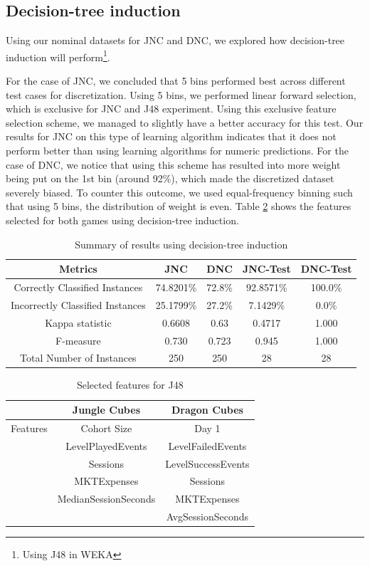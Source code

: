 \subsection{Decision-tree induction}
Using our nominal datasets for JNC and DNC, we explored how decision-tree induction will perform\footnote{Using J48 in WEKA}. 

For the case of JNC, we concluded that 5 bins performed best across different test cases for discretization. Using 5 bins, we performed linear forward selection, which is exclusive for JNC and J48 experiment. Using this exclusive feature selection scheme, we managed to slightly have a better accuracy for this test. Our results for JNC on this type of learning algorithm indicates that it does not perform better than using learning algorithms for numeric predictions. For the case of DNC, we notice that using this scheme has resulted into more weight being put on the 1st bin (around 92\%), which made the discretized dataset severely biased. To counter this outcome, we used equal-frequency binning such that using 5 bins, the distribution of weight is even. Table \ref{table:j48_features} shows the features selected for both games using decision-tree induction.

\begin{table}[h]
\centering
\caption{Summary of results using decision-tree induction}
\label{table:j48_summary_results}
\begin{tabular}{|c|c|c|c|c|}
\hline 
Metrics & JNC & DNC & JNC-Test & DNC-Test \\ 
\hline 
Correctly Classified Instances  & 74.8201\% & 72.8\%  & 92.8571\%  & 100.0\%\\
Incorrectly Classified Instances & 25.1799\% & 27.2\% & 7.1429\% & 0.0\%\\
Kappa statistic & 0.6608 & 0.63 & 0.4717 & 1.000 \\
F-measure & 0.730 & 0.723 & 0.945 & 1.000 \\
Total Number of Instances & 250 & 250 & 28 & 28
\\
\hline 
\end{tabular}
\end{table}

\begin{table}[h]
\centering
\caption{Selected features for J48}
\label{table:j48_features}
\begin{tabular}{|c|c|c|}
\hline 
 & Jungle Cubes & Dragon Cubes\\ 
\hline 
Features & Cohort Size & Day 1 
\\& LevelPlayedEvents & LevelFailedEvents
\\& Sessions & LevelSuccessEvents 
\\& MKTExpenses & Sessions 
\\& MedianSessionSeconds &MKTExpenses
\\&  &AvgSessionSeconds\\ 
\hline 
\end{tabular}
\end{table}

